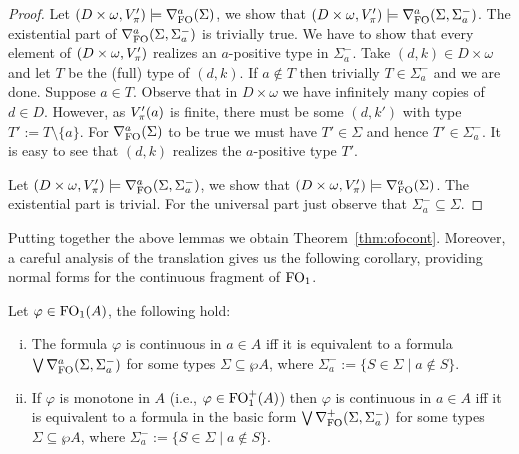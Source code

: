 \begin{proof}
\bigskip
\noindent \fbox{$\Rightarrow$}
Let $(D\times\omega,\val'_\pi) \models \mondbnfofo{\Sigma}{a}$, we show that $(D\times\omega,\val'_\pi) \models \mondgbnfofo{\Sigma}{\Sigma^{-}_{a}}{a}$. The existential part of $\mondgbnfofo{\Sigma}{\Sigma^{-}_{a}}{a}$ is trivially true. We have to show that every element of $(D\times\omega,\val'_\pi)$ realizes an $a$-positive type in $\Sigma^{-}_{a}$. Take $(d,k) \in D\times\omega$ and let $T$ be the (full) type of $(d,k)$. If $a\notin T$ then trivially $T\in \Sigma^{-}_{a}$ and we are done. Suppose $a\in T$. Observe that in $D\times\omega$ we have infinitely many copies of $d\in D$. However, as $\val'_\pi(a)$ is finite, there must be some $(d,k')$ with type $T' := T\setminus\{a\}$.
For $\mondbnfofo{\Sigma}{a}$ to be true we must have $T'\in \Sigma$ and hence $T'\in \Sigma^{-}_{a}$. It is easy to see that $(d,k)$ realizes the $a$-positive type $T'$.

\bigskip
\noindent \fbox{$\Leftarrow$}
Let $(D\times\omega,\val'_\pi) \models \mondgbnfofo{\Sigma}{\Sigma^{-}_{a}}{a}$, we show that $(D\times\omega,\val'_\pi) \models \mondbnfofo{\Sigma}{a}$. The existential part is trivial. For the universal part just observe that $\Sigma^{-}_{a} \subseteq \Sigma$.
\end{proof}

Putting together the above lemmas we obtain Theorem~\ref{thm:ofocont}. Moreover, a careful analysis of the translation gives us the following corollary, providing normal forms for the continuous fragment of $\ofo$.

\begin{corollary}\label{cor:ofocontinuousnf}
	Let $\varphi \in \ofo(A)$, the following hold:
	\begin{enumerate}[(i)]
		\item The formula $\varphi$ is continuous in $a \in A$ iff it is equivalent to a formula $\bigvee \mondgbnfofo{\Sigma}{\Sigma^{-}_{a}}{a}$ for some types $\Sigma \subseteq \wp A$, where $\Sigma^{-}_{a} := \{S\in \Sigma \mid a\notin S\}$.
		\item If $\varphi$ is monotone in $A$ (i.e., $\varphi\in\ofo^+(A)$) then $\varphi$ is continuous in $a \in A$ iff it is equivalent to a formula in the basic form $\bigvee \posdgbnfofo{\Sigma}{\Sigma^{-}_{a}}$ for some types $\Sigma \subseteq \wp A$, where $\Sigma^{-}_{a} := \{S\in \Sigma \mid a\notin S\}$.
	\end{enumerate}
\end{corollary}

